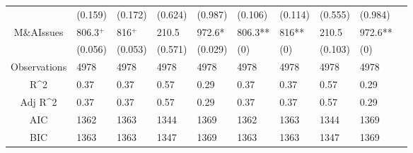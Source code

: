 \documentclass{article}
\begin{document}
\begin{table}[H]
\begin{tabular}{|clllllllll|}
   & (0.159) & (0.172) & (0.624) & (0.987) & (0.106) & (0.114) & (0.555) & (0.984) & \\ 
  M\&AIssues & 806.3$^{+}$ & 816$^{+}$ & 210.5 & 972.6* & 806.3** & 816** & 210.5 & 972.6** & \\ 
   & (0.056) & (0.053) & (0.571) & (0.029) & (0) & (0) & (0.103) & (0) & \\ 
  \hline 
 Observations & 4978 & 4978 & 4978 & 4978 & 4978 & 4978 & 4978 & 4978 & \\ 
  R^2 & 0.37 & 0.37 & 0.57 & 0.29 & 0.37 & 0.37 & 0.57 & 0.29 & \\ 
  Adj R^2 & 0.37 & 0.37 & 0.57 & 0.29 & 0.37 & 0.37 & 0.57 & 0.29 & \\ 
  AIC & 1362 & 1363 & 1344 & 1369 & 1362 & 1363 & 1344 & 1369 & \\ 
  BIC & 1363 & 1363 & 1347 & 1369 & 1363 & 1363 & 1347 & 1369 & \\ 
   \hline
\end{tabular}
 
\end{table}
\end{document}
